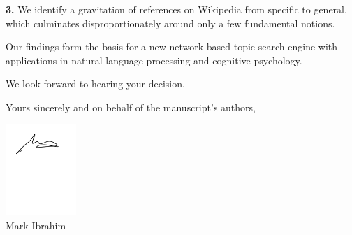 \documentclass[11pt]{article}
\begin{document}
\textbf{3.}
We identify a gravitation of references on Wikipedia from  specific to general, which culminates disproportionately around only a few fundamental notions. 


Our findings form the basis for a new network-based topic search engine with applications in natural language processing and cognitive psychology.

We look forward to hearing your decision.

Yours sincerely and on behalf of the manuscript's authors,

\includegraphics[width=0.2\textwidth]{signature}\\
Mark Ibrahim



\end{document}
